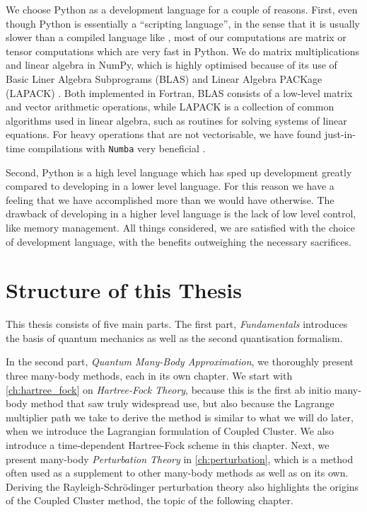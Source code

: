     We choose Python as a development language for a couple of reasons. 
    First, even though Python is essentially a  ``scripting language'', in the sense 
    that it is usually slower than a compiled language like \CC,
    most of our computations are matrix or tensor computations which are very fast
    in Python. We do matrix multiplications and linear algebra in NumPy, which 
    is highly optimised because of its use of Basic Liner Algebra Subprograms
    (BLAS) \cite{BLAS}
    and Linear Algebra PACKage (LAPACK) \cite{LAPACK}.
    Both implemented in Fortran, BLAS consists of a low-level matrix and vector 
    arithmetic operations, while LAPACK is a collection of common algorithms 
    used in linear algebra, such as routines for solving systems of linear 
    equations. For heavy operations that are not vectorisable, we have found
    just-in-time compilations with \lstinline{Numba} very beneficial \cite{numba}.

    Second, Python is a high level language which has sped up development greatly 
    compared to developing in a lower level language. For this reason we 
    have a feeling that we have accomplished more than we would have 
    otherwise. The drawback of developing in a higher level language is the 
    lack of low level control, like memory management. All things considered,
    we are satisfied with the choice of development language, with the benefits 
    outweighing the necessary sacrifices.

\section{Structure of this Thesis}

    This thesis consists of five main parts. The first part, \emph{Fundamentals} 
    introduces the basis of quantum mechanics as well as the second quantisation 
    formalism.
    
    In the second part, \emph{Quantum Many-Body Approximation}, we 
    thoroughly present three many-body methods, each in its own chapter.
    We start with \autoref{ch:hartree_fock} on \emph{Hartree-Fock Theory},
    because this is 
    the first ab initio many-body method that saw truly widespread use, but 
    also because the Lagrange multiplier path we take to derive the method is 
    similar to what we will do later, when we introduce the Lagrangian formulation 
    of Coupled Cluster.
    We also introduce a time-dependent Hartree-Fock scheme in this chapter.
    Next, we present many-body \emph{Perturbation Theory} in \autoref{ch:perturbation},
    which is a method often used as
    a supplement to other many-body methods as well as on its own. Deriving 
    the Rayleigh-Schrödinger perturbation theory also highlights the origins 
    of the Coupled Cluster method, the topic of the following chapter.
    
